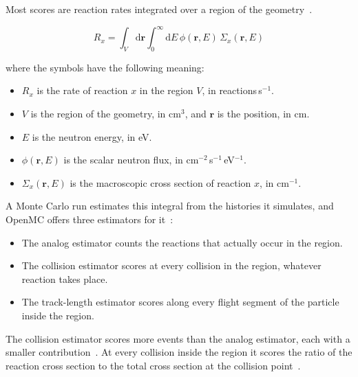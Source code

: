 Most scores are reaction rates integrated over a region of the
geometry~\cite{lux_koblinger_1991}.

\begin{equation}
R_x = \int_V \mathrm{d}\mathbf{r} \int_0^\infty \mathrm{d}E\,
\phi(\mathbf{r},E)\,\Sigma_x(\mathbf{r},E)
\label{eq:mc-rr}
\end{equation}

\noindent where the symbols have the following meaning:

\begin{itemize}
  \item $R_x$ is the rate of reaction $x$ in the region $V$, in
        reactions\,s$^{-1}$.

  \item $V$ is the region of the geometry, in cm$^{3}$, and
        $\mathbf{r}$ is the position, in cm.

  \item $E$ is the neutron energy, in eV.

  \item $\phi(\mathbf{r},E)$ is the scalar neutron flux, in
        cm$^{-2}$\,s$^{-1}$\,eV$^{-1}$.

  \item $\Sigma_x(\mathbf{r},E)$ is the macroscopic cross section of
        reaction $x$, in cm$^{-1}$.
\end{itemize}

A Monte Carlo run estimates this integral from the histories it
simulates, and OpenMC offers three estimators for it~\cite{openmc_docs}:

\begin{itemize}
  \item The analog estimator counts the reactions that actually occur
        in the region.

  \item The collision estimator scores at every collision in the
        region, whatever reaction takes place.

  \item The track-length estimator scores along every flight segment
        of the particle inside the region.
\end{itemize}

The collision estimator scores more events than the analog estimator,
each with a smaller contribution~\cite{openmc_docs}. At every collision
inside the region it scores the ratio of the reaction cross section to
the total cross section at the collision point~\cite{lux_koblinger_1991}.

